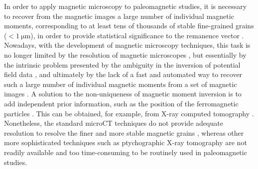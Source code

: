 In order to apply magnetic microscopy to paleomagnetic studies, it is necessary
to recover from the magnetic images a large number of individual magnetic
moments, corresponding to at least tens of thousands of stable fine-grained
grains ($< \qty{1}{\um}$), in order to provide statistical significance to the
remanence vector \citep{Berndt2016}. Nowadays, with the development of
magnetic microscopy techniques, this task is no longer limited by the
resolution of magnetic microscopes \citep[\textit{e.g.}, ][]{Fu2020, Weiss2007, DeGroot2018,
Glenn2017, Lima2014, Reis2016}, but essentially by the intrinsic problem presented by the
ambiguity in the inversion of potential field data \citep{Barbosa2011,
DeGroot2021, Oliveira2015Estimation}, and ultimately by the lack of a fast and
automated way to recover such a large number of individual magnetic moments
from a set of magnetic images \citep{CortesOrtuno2022, Lima2013, Lima2009}. A
solution to the non-uniqueness of magnetic moment inversion is to add
independent prior information, such as the position of the ferromagnetic
particles \citep{Fabian2019}. This can be obtained, for example, from X-ray
computed tomography \citep[microCT; ][]{Fabian2019, DeGroot2021, DeGroot2018}.
Nonetheless, the standard microCT techniques do not provide adequate resolution
to resolve the finer and more stable magnetic grains \citep{CortesOrtuno2022,
DeGroot2021}, whereas other more sophisticated techniques such as ptychographic
X-ray tomography \citep[\textit{e.g.}, ][]{Maldanis2020} are not readily available and
too time-consuming to be routinely used in paleomagnetic studies.

